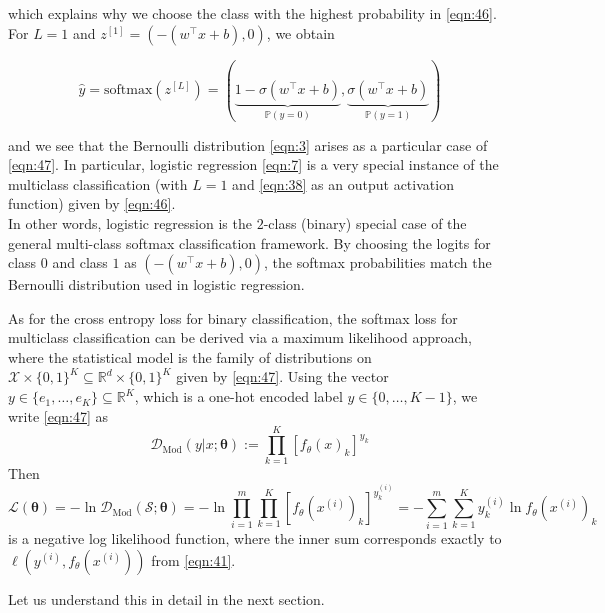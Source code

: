 which explains why we choose the class with the highest probability in \ref{eqn:46}.\\

For $L=1$ and $z^{[1]} = (-(w^\top x + b),0)$, we obtain

\begin{equation}
\hat{y} = \text{softmax}(z^{[L]}) = \left(\underbrace{1 - \sigma(w^\top x + b)}_{\mathbb{P}(y=0)}, \underbrace{\sigma(w^\top x + b)}_{\mathbb{P}(y=1)}\right)
\label{eqn:48}
\end{equation}

and we see that the Bernoulli distribution \ref{eqn:3} arises as a particular case of \ref{eqn:47}. In particular, logistic regression \ref{eqn:7} is a very special instance of the multiclass classification (with $L = 1$ and \ref{eqn:38} as an output activation function) given by \ref{eqn:46}.\\

In other words, logistic regression is the $2$-class (binary) special case of the general multi-class softmax classification framework. By choosing the logits for class $0$ and class $1$ as $(-(w^\top x + b), 0)$, the softmax probabilities match the Bernoulli distribution used in logistic regression.

\begin{remark}
As for the cross entropy loss for binary classification, the softmax loss for multiclass classification can be derived via a maximum likelihood approach, where the statistical model is the family of distributions on $\mathcal{X} \times \{0, 1\}^K \subseteq \mathbb{R}^d \times \{0, 1\}^K$ given by \ref{eqn:47}. Using the vector $y \in \{e_1, \ldots, e_K\} \subseteq \mathbb{R}^K$, which is a one-hot encoded label $y \in \{0, \ldots, K-1\}$, we write \ref{eqn:47} as
\begin{equation}
    \mathcal{D}_{\text{Mod}}(y|x;\boldsymbol{\theta}) := \prod_{k=1}^{K} [f_{\theta}(x)_{k}]^{y_k}
    \label{eqn:49}
\end{equation}
Then
\begin{equation}
    \mathcal{L}(\boldsymbol{\theta}) = -\ln \mathcal{D}_{\text{Mod}}(\mathcal{S} ; \boldsymbol{\theta}) = -\ln \prod_{i=1}^{m} \prod_{k=1}^{K} \left[ f_\theta(x^{(i)})_k \right]^{y_k^{(i)}} = - \sum_{i=1}^{m} \sum_{k=1}^{K} y_k^{(i)} \ln f_\theta(x^{(i)})_k
    \label{eqn:50}
\end{equation}
is a negative log likelihood function, where the inner sum corresponds exactly to $\ell(y^{(i)}, f_{\theta}(x^{(i)}))$ from \ref{eqn:41}.
\end{remark}
Let us understand this in detail in the next section.

